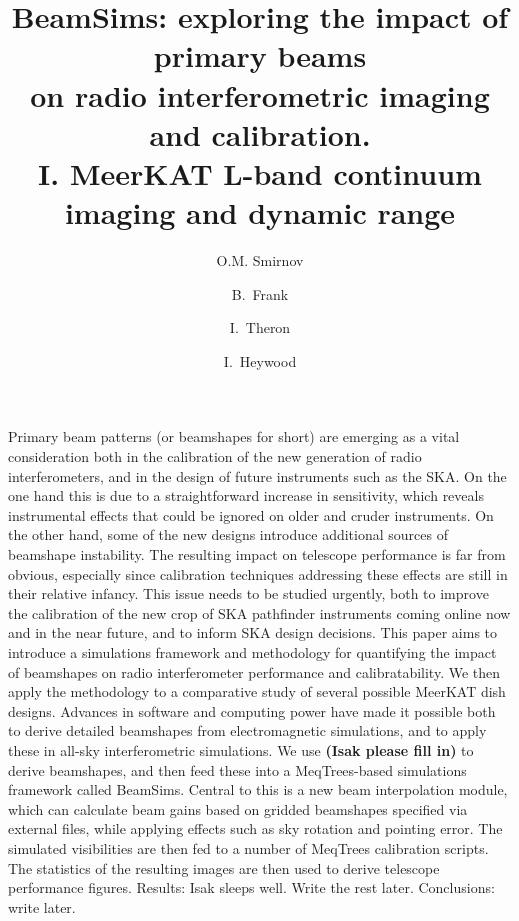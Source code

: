 \documentclass{aa}
\begin{document}
\title{BeamSims: exploring the impact of primary beams\\on radio interferometric imaging and calibration.\\I. MeerKAT L-band continuum imaging and dynamic range}

\author{O.M. Smirnov\inst{\ref{inst:astron},\ref{inst:ru}} \and B.\ Frank\inst{\ref{inst:uct-astro}} \and I.\ Theron\inst{\ref{inst:emss}} \and I.\ Heywood\inst{\ref{inst:oap}}}


\date{}



\abstract%
{Primary beam patterns (or beamshapes for short) are emerging as a vital consideration both in the calibration of the new generation of radio interferometers, and in the design of future instruments such as the SKA. On the one hand this is due to a straightforward increase in sensitivity, which reveals instrumental effects that could be ignored on older and cruder instruments. On the other hand, some of the new designs introduce additional sources of beamshape instability. The resulting impact on telescope performance is far from obvious, especially since calibration techniques addressing these effects are still in their relative infancy. This issue needs to be studied urgently, both to improve the calibration of the new crop of SKA pathfinder instruments coming online now and in the near future, and to inform SKA design decisions.}
{This paper aims to introduce a simulations framework and methodology for quantifying the impact of beamshapes on radio interferometer performance and calibratability. We then apply the methodology to a comparative study of several possible MeerKAT dish designs.}
{Advances in software and computing power have made it possible both to derive detailed beamshapes from electromagnetic simulations, and to apply these in all-sky interferometric simulations. We use {{\bf (Isak please fill in)}} to derive beamshapes, and then feed these into a MeqTrees-based simulations framework called BeamSims. Central to this is a new beam interpolation module, which can calculate beam gains based on gridded beamshapes specified via external files, while
applying effects such as sky rotation and pointing error. The simulated visibilities are then fed to a number of MeqTrees calibration scripts. The statistics of the resulting images are then used to derive telescope performance figures.}
{Results: Isak sleeps well. Write the rest later.}
{Conclusions: write later.}
\end{document}

